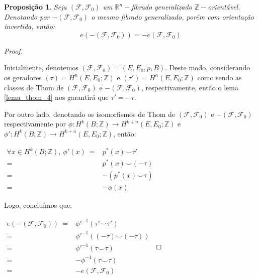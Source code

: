 \documentclass[12pt,oneside]{book} %
\newtheorem{prop}   {\hspace{0.5cm}Proposi\c c\~ao}[chapter]
\newcommand{\R}{\mathbb{R}}
\newcommand{\Z}{\mathbb{Z}}
\newcommand{\ccup}{\smile}
\begin{document}
\begin{prop}
	Seja $(\mathcal{F},\mathcal{F}_{0})$ um $\R^{n}-$fibrado generalizado $\Z-$orientável. Denotando por $-(\mathcal{F},\mathcal{F}_{0})$ o mesmo fibrado generalizado, porém com orientação invertida, então:
	$$ e\left( -(\mathcal{F},\mathcal{F}_{0}) \right)=-e(\mathcal{F},\mathcal{F}_{0}) $$
\end{prop}
\begin{proof}
	
	\
	
	\par Inicialmente, denotemos $(\mathcal{F},\mathcal{F}_{0})=(E,E_{0},p,B)$. Deste modo, considerando os geradores $(\tau)=H^{n}(E,E_{0};\Z)$ e $(\tau')=H^{n}(E,E_{0};\Z)$ como sendo as classes de Thom de $(\mathcal{F},\mathcal{F}_{0})$ e $-(\mathcal{F},\mathcal{F}_{0})$, respectivamente, então o lema \ref{lema_thom_4} nos garantirá que $\tau'=-\tau$.
	
	\par Por outro lado, denotando os isomorfismos de Thom de $(\mathcal{F},\mathcal{F}_{0})$ e $-(\mathcal{F},\mathcal{F}_{0})$ respectivamente por $\phi:H^{k}(B;\Z)\to H^{k+n}(E,E_{0};\Z)$ e $\phi':H^{k}(B;\Z)\to H^{k+n}(E,E_{0};\Z)$, então: \newline
	
	$\begin{array}{rl}
		\forall x\in H^{k}(B;\Z), \ \phi'(x) \ = & p^{*}(x)\ccup \tau' \\
		= & p^{*}(x)\ccup (-\tau) \\
		= & -\left( p^{*}(x)\ccup \tau \right) \\
		= & -\phi(x)
	\end{array}$ \newline
	
	Logo, concluímos que: \newline
	
	$\begin{array}{rl}
		e\left( -(\mathcal{F},\mathcal{F}_{0}) \right) \ = & \phi'^{-1}(\tau'\ccup\tau') \\
		= & \phi'^{-1}((-\tau)\ccup (-\tau)) \\
		= & \phi'^{-1}(\tau\ccup\tau) \\
		= & -\phi^{-1}(\tau\ccup\tau) \\
		= & -e(\mathcal{F},\mathcal{F}_{0})
	\end{array}$	
	
\end{proof}
\end{document}
